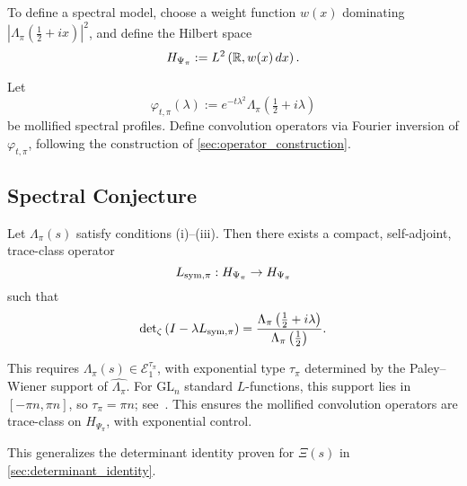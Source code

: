 \medskip
To define a spectral model, choose a weight function \( w(x) \) dominating \( |\Lambda_\pi(\tfrac{1}{2} + ix)|^2 \), and define the Hilbert space
\[
H_{\Psi_\pi} := L^2\left( \mathbb{R}, w(x)\, dx \right).
\]

Let
\[
\varphi_{t,\pi}(\lambda) := e^{-t\lambda^2} \Lambda_\pi\left( \tfrac{1}{2} + i\lambda \right)
\]
be mollified spectral profiles. Define convolution operators via Fourier inversion of \( \varphi_{t,\pi} \), following the construction of \cref{sec:operator_construction}.

\subsection*{Spectral Conjecture}

\begin{conjecture}
Let \( \Lambda_\pi(s) \) satisfy conditions (i)--(iii). Then there exists a compact, self-adjoint, trace-class operator
\[
L_{\mathrm{sym},\pi} : H_{\Psi_\pi} \to H_{\Psi_\pi}
\]
such that
\[
\det\nolimits_\zeta\left( I - \lambda L_{\mathrm{sym},\pi} \right)
= \frac{ \Lambda_\pi\left( \tfrac{1}{2} + i\lambda \right) }{ \Lambda_\pi\left( \tfrac{1}{2} \right) }.
\]

\medskip

This requires \( \Lambda_\pi(s) \in \mathcal{E}_1^{\tau_\pi} \), with exponential type \( \tau_\pi \) determined by the Paley–Wiener support of \( \widehat{\Lambda_\pi} \). For \( \mathrm{GL}_n \) standard \( L \)-functions, this support lies in \( [-\pi n, \pi n] \), so \( \tau_\pi = \pi n \); see~\cite[Thm.~3.2.4]{Levin1996EntireLectures}. This ensures the mollified convolution operators are trace-class on \( H_{\Psi_\pi} \), with exponential control.
\end{conjecture}

This generalizes the determinant identity proven for \( \Xi(s) \) in \cref{sec:determinant_identity}.

